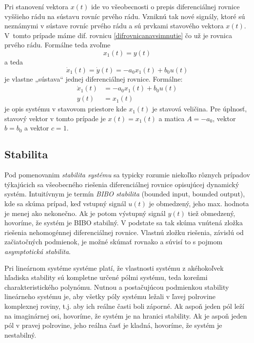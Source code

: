 \documentclass[a4paper, 10pt, ]{article}
\begin{document}
Pri stanovení vektora $x(t)$ ide vo všeobecnosti o prepis diferenciálnej rovnice vyššieho rádu na sústavu rovníc prvého rádu. Vzniknú tak nové signály, ktoré sú neznámymi v sústave rovníc prvého rádu a sú prvkami stavového vektora $x(t)$. V~tomto prípade máme dif. rovnicu \eqref{difrovnicanavsimnutie} čo už je rovnica prvého rádu. Formálne teda zvoľme
\begin{equation}
    x_1(t) = y(t)
\end{equation}
a teda
\begin{equation}
    \dot x_1(t) = \dot y(t) = - a_0 x_1(t) + b_0 u(t)
\end{equation}
je vlastne „sústava“ jednej diferenciálnej rovnice. Formálne:
\begin{subequations}
\begin{align}
    \dot x_1(t) &= - a_0 x_1(t) + b_0 u(t) \\
    y(t) &= x_1(t)
\end{align}
\end{subequations}
je opis systému v stavovom priestore kde $x_1(t)$ je stavová veličina. Pre úplnosť, stavový vektor v tomto prípade je $x(t) = x_1(t)$ a matica $A = -a_0$, vektor $b = b_0$ a vektor $c = 1$.







\subsection{Stabilita}

Pod pomenovanim \emph{stabilita systému} sa typicky rozumie niekoľko rôznych prípadov týkajúcich sa všeobecného riešenia diferenciálnej rovnice opisujúcej dynamický systém. Intuitívnym je termín \emph{BIBO stabilita} (bounded input, bounded output), kde sa skúma prípad, keď vstupný signál $u(t)$ je obmedzený, jeho max. hodnota je menej ako nekonečno. Ak je potom výstupný signál $y(t)$ tiež obmedzený, hovoríme, že systém je BIBO stabilný. V podstate sa tak skúma vnútená zložka riešenia nehomogénnej diferenciálnej rovnice. Vlastnú zložku riešenia, závislú od začiatočných podmienok, je možné skúmať rovnako a súvisí to s pojmom \emph{asymptotická stabilita}. 

Pri lineárnom systéme systéme platí, že vlastnosti systému z akéhokoľvek hľadiska stability sú kompletne určené pólmi systému, teda koreňmi charakteristického polynómu. Nutnou a postačujúcou podmienkou stability lineárneho systému je, aby všetky póly systému ležali v ľavej polrovine komplexnej roviny, t.j. aby ich reálne časti boli záporné. Ak aspoň jeden pól leží na imaginárnej osi, hovoríme, že systém je na hranici stability. Ak je aspoň jeden pól v pravej polrovine, jeho reálna časť je kladná, hovoríme, že systém je nestabilný.
\end{document}
